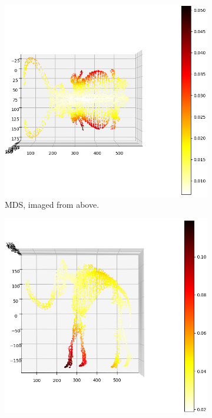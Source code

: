 \begin{figure}[!]
     \centering
     \begin{subfigure}[t]{0.51\columnwidth}
    	\centering
    	\includegraphics[width=\columnwidth]{images/reverse_mds_mammoth.png}
    	\caption{MDS, imaged from above.}
        \label{fig:reverse_mds_mammoth}
    \end{subfigure}
     \hfill
     \begin{subfigure}[t]{0.49\columnwidth}
    	\centering
    	\includegraphics[width=\columnwidth]{images/reverse_best_lle_mammoth.png}

\end{subfigure}
\end{figure}
